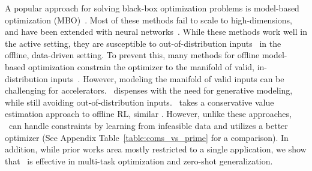 A popular approach for solving black-box optimization problems is model-based optimization (MBO)~\citep{snoek15scalable,shahriari2016TakingTH,snoek2012practical}. Most of these methods fail to scale to high-dimensions, and have been extended with neural networks~\citep{snoek15scalable,snoek2012practical,kim2018attentive,garnelo18neural,garnelo18conditional,p3bo:arxiv:2020,angermueller2019model,mirhoseini2020chip}. While these methods work well in the active setting, they are susceptible to out-of-distribution inputs~\citep{trabucco2021designbench} in the offline, data-driven setting. To prevent this, many methods for offline model-based optimization constrain the optimizer to the manifold of valid, in-distribution inputs~\citep{brookes19a,fannjiang2020autofocused,kumar2019model}. However, modeling the manifold of valid inputs can be challenging for accelerators. \primemethodname\ dispenses with the need for generative modeling, while still avoiding out-of-distribution inputs. \primemethodname\  takes a conservative value estimation approach to offline RL, similar \citet{trabucco2021conservative}. However, unlike these approaches, \primemethodname\ can handle constraints by learning from infeasible data and utilizes a better optimizer (See Appendix Table~\ref{table:coms_vs_prime} for a comparison). In addition, while prior works area mostly restricted to a single application, we show that \primemethodname\ is effective in multi-task optimization and zero-shot generalization.